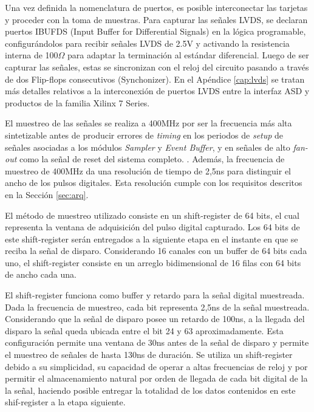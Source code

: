 	Una vez definida la nomenclatura de puertos, es posible interconectar las tarjetas y proceder con la toma de muestras. Para capturar las señales LVDS, se declaran puertos IBUFDS (Input Buffer for Differential Signals) \cite{Xilinx2012XilinxDesigns} en la lógica programable, configurándolos para recibir señales LVDS de 2.5V y activando la resistencia interna de 100$\Omega$ para adaptar la terminación al estándar diferencial. Luego de ser capturar las señales, estas se sincronizan con el reloj del circuito pasando a través de dos Flip-flops consecutivos (Synchonizer). En el Apéndice \ref{cap:lvds} se tratan más detalles relativos a la interconexión de puertos LVDS entre la interfaz ASD y productos de la familia Xilinx 7 Series.
	
	El muestreo  de las señales se realiza a 400MHz por ser la frecuencia más alta sintetizable antes de producir errores de \textit{timing} en los periodos de \textit{setup} de señales asociadas a los módulos \textit{Sampler} y \textit{Event Buffer}, y en señales de alto \textit{fan-out} como la señal de reset del sistema completo. . Además, la frecuencia de muestreo de 400MHz da una resolución de tiempo de 2,5ns para distinguir el ancho de los pulsos digitales. Esta resolución cumple con los requisitos descritos en la Sección \ref{sec:arq}.
	
	El método de muestreo utilizado consiste en un shift-register de 64 bits, el cual representa la ventana de adquisición del pulso digital capturado. Los 64 bits de este shift-register serán entregados a la siguiente etapa en el instante en que se reciba la señal de disparo. Considerando 16 canales con un buffer de 64 bits cada uno, el shift-register consiste en un arreglo bidimensional de 16 filas con 64 bits de ancho cada una.
	
	El shift-register funciona como buffer y retardo para la señal digital muestreada. Dada la frecuencia de muestreo, cada bit representa 2,5ns de la señal muestreada. Considerando que la señal de disparo posee un retardo de 100ns, a la llegada del disparo la señal queda ubicada entre el bit 24 y 63 aproximadamente. Esta configuración permite una ventana de 30ns antes de la señal de disparo y permite el muestreo de señales de hasta 130ns de duración. Se utiliza un shift-register debido a su simplicidad, su capacidad de operar a altas frecuencias de reloj y por permitir el almacenamiento natural por orden de llegada de cada bit digital de la la señal, haciendo posible entregar la totalidad de los datos contenidos en este shif-register a la etapa siguiente.
	
